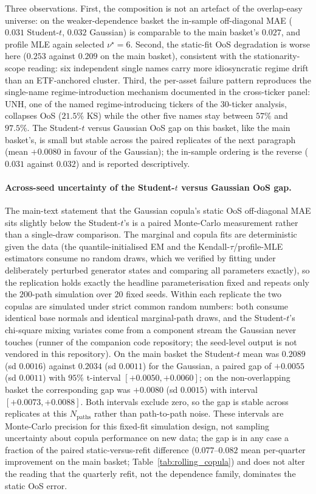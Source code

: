 Three observations. First, the composition is not an artefact of the overlap-easy universe: on the weaker-dependence basket the in-sample off-diagonal MAE ($0.031$ Student-$t$, $0.032$ Gaussian) is comparable to the main basket's $0.027$, and profile MLE again selected $\nu^\star = 6$. Second, the static-fit OoS degradation is worse here ($0.253$ against $0.209$ on the main basket), consistent with the stationarity-scope reading: six independent single names carry more idiosyncratic regime drift than an ETF-anchored cluster. Third, the per-asset failure pattern reproduces the single-name regime-introduction mechanism documented in the cross-ticker panel: UNH, one of the named regime-introducing tickers of the 30-ticker analysis, collapses OoS ($21.5\%$ KS) while the other five names stay between $57\%$ and $97.5\%$. The Student-$t$ versus Gaussian OoS gap on this basket, like the main basket's, is small but stable across the paired replicates of the next paragraph (mean $+0.0080$ in favour of the Gaussian); the in-sample ordering is the reverse ($0.031$ against $0.032$) and is reported descriptively.

\paragraph{Across-seed uncertainty of the Student-$t$ versus Gaussian OoS gap.}
The main-text statement that the Gaussian copula's static OoS off-diagonal MAE sits slightly below the Student-$t$'s is a paired Monte-Carlo measurement rather than a single-draw comparison. The marginal and copula fits are deterministic given the data (the quantile-initialised EM and the Kendall-$\tau$/profile-MLE estimators consume no random draws, which we verified by fitting under deliberately perturbed generator states and comparing all parameters exactly), so the replication holds exactly the headline parameterisation fixed and repeats only the $200$-path simulation over $20$ fixed seeds. Within each replicate the two copulas are simulated under strict common random numbers: both consume identical base normals and identical marginal-path draws, and the Student-$t$'s chi-square mixing variates come from a component stream the Gaussian never touches (runner  of the companion code repository; the seed-level output is not vendored in this repository). On the main basket the Student-$t$ mean was $0.2089$ (sd $0.0016$) against $0.2034$ (sd $0.0011$) for the Gaussian, a paired gap of $+0.0055$ (sd $0.0011$) with $95\%$ t-interval $[+0.0050, +0.0060]$; on the non-overlapping basket the corresponding gap was $+0.0080$ (sd $0.0015$) with interval $[+0.0073, +0.0088]$. Both intervals exclude zero, so the gap is stable across replicates at this $N_{\text{paths}}$ rather than path-to-path noise. These intervals are Monte-Carlo precision for this fixed-fit simulation design, not sampling uncertainty about copula performance on new data; the gap is in any case a fraction of the paired static-versus-refit difference ($0.077$--$0.082$ mean per-quarter improvement on the main basket; Table~\ref{tab:rolling_copula}) and does not alter the reading that the quarterly refit, not the dependence family, dominates the static OoS error.

